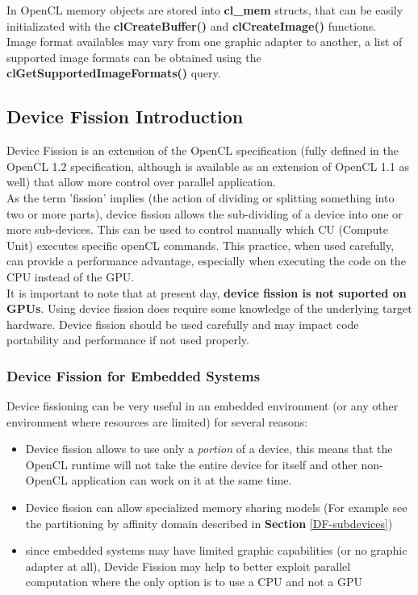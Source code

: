 \begin{CLCode}
In OpenCL memory objects are stored into \textbf{cl\_mem} structs, that can be easily initializated with the \textbf{clCreateBuffer()} and \textbf{clCreateImage()} functions.\\
Image format availables may vary from one graphic adapter to another, a list of supported image formats can be obtained using the \textbf{clGetSupportedImageFormats()} query.
\end{CLCode}





\subsection{Device Fission Introduction}

Device Fission is an extension of the OpenCL specification (fully defined in the OpenCL 1.2 specification, although is available as an extension of OpenCL 1.1 as well) that allow more control over parallel application.\\
As the term 'fission' implies (the action of dividing or splitting something into two or more parts), device fission allows the sub-dividing of a device into one or more sub-devices. This can be used to control manually which CU (Compute Unit) executes specific openCL commands. This practice, when used carefully, can provide a performance advantage, especially when executing the code on the CPU instead of the GPU.\cite{intel:12:DeviceFission}\\ It is important to note that at present day, \textbf{device fission is not suported on GPUs}.\cite{gaster:11:DeviceFission}
Using device fission does require some knowledge of the underlying target hardware. Device fission should be used carefully and may impact code portability and performance if not used properly.

\subsubsection{Device Fission for Embedded Systems}
Device fissioning can be very useful in an embedded environment (or any other environment where resources are limited) for several reasons:

\begin{itemize}
	\item Device fission allows to use only a \emph{portion} of a device, this means that the OpenCL runtime will not take the entire device for itself and other non-OpenCL application can work on it at the same time.
	\item Device fission can allow specialized memory sharing models (For example see the partitioning by affinity domain described in \textbf{Section} \ref{DF-subdevices})
	\item since embedded systems may have limited graphic capabilities (or no graphic adapter at all), Devide Fission may help to better exploit parallel computation where the only option is to use a CPU and not a GPU
\end{itemize}

